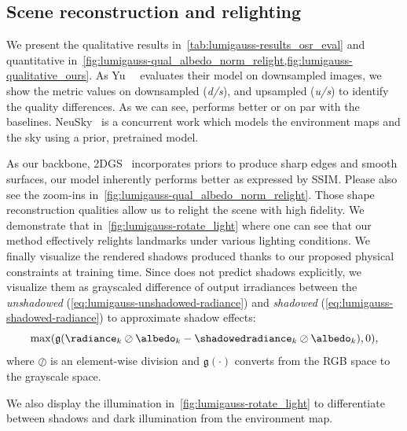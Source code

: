   \subsection{Scene reconstruction and relighting}

    We present the qualitative results in~\cref{tab:lumigauss-results_osr_eval}
    and quantitative
    in~\cref{fig:lumigauss-qual_albedo_norm_relight,fig:lumigauss-qualitative_ours}.
    As Yu~\etal~\cite{yu2020self} evaluates their model on downsampled images, we
    show the metric values on downsampled (\textit{d/s}), and upsampled
    (\textit{u/s}) to identify the quality differences.
    As we can see, \lumigauss performs better or on par with the baselines.
    NeuSky~\cite{gardner2023neusky} is a concurrent work which models the
    environment maps and the sky using a prior, pretrained model.

    
    As our backbone, 2DGS~\cite{huang20242d} incorporates priors to produce sharp
    edges and smooth surfaces, our model inherently performs better as expressed
    by SSIM.
    Please also see the zoom-ins in~\cref{fig:lumigauss-qual_albedo_norm_relight}.
    Those shape reconstruction qualities allow us to relight the scene with high
    fidelity.
    We demonstrate that in~\cref{fig:lumigauss-rotate_light} where one can see
    that our method effectively relights landmarks under various lighting
    conditions.
    We finally visualize the rendered shadows produced thanks to our proposed
    physical constraints at training time.
    Since \lumigauss does not predict shadows explicitly, we visualize them as grayscaled difference of output irradiances between the \textit{unshadowed} (\cref{eq:lumigauss-unshadowed-radiance}) and \textit{shadowed} (\cref{eq:lumigauss-shadowed-radiance}) to approximate shadow effects:
    \begin{equation}
      \max(\mathfrak{g}(\radiance_k \oslash \albedo_k - \shadowedradiance_k \oslash \albedo_k), 0),
    \end{equation}
    where $\oslash$ is an element-wise division and $\mathfrak{g}(\cdot)$ converts from the RGB space to the grayscale space.

    We also display the illumination in~\cref{fig:lumigauss-rotate_light} to
    differentiate between shadows and dark illumination from the environment map.

